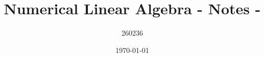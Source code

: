 \author{260236}
\title{Numerical Linear Algebra - Notes - \version}
\date{\printdayoff\today}
\maketitle